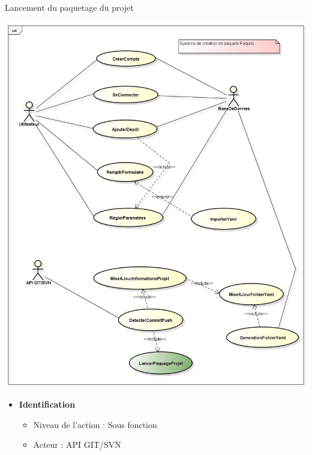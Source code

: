 \documentclass[9pt,xcolor=dvipsnames]{beamer}
\begin{document}
\begin{frame}{Lancement du paquetage du projet}
  \begin{minipage}{0.40\textwidth}
    \begin{flushleft}
      \includegraphics[scale=\largeur]{../img/Diagram_lancerPaquetageProjet.jpg}
    \end{flushleft}
  \end{minipage}
  \hfill
  \begin{minipage}{0.50\textwidth}
    \begin{flushright}
      \begin{itemize}
      \item \textbf{Identification}
        \begin{itemize}
        \item[] Niveau de l'action : Sous fonction
        \item[] Acteur : API GIT/SVN
        \end{itemize}

\end{itemize}
\end{flushright}
\end{minipage}
\end{frame}
\end{document}
